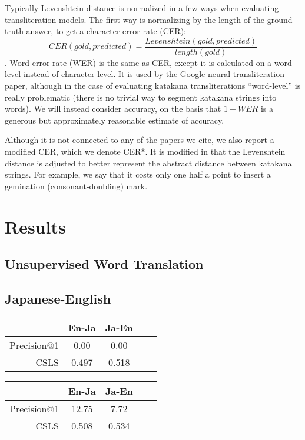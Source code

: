 \documentclass{article}
\begin{document}
Typically Levenshtein distance is normalized in a few ways
when evaluating transliteration models.
The first way is normalizing by the length of the ground-truth answer,
to get a character error rate (CER):
$$CER(gold, predicted) = \frac{Levenshtein(gold, predicted)}{length(gold)}$$.
Word error rate (WER) is the same as CER,
except it is calculated on a word-level instead of character-level.
It is used by the Google neural transliteration paper,
although in the case of evaluating katakana transliterations
``word-level'' is really problematic
(there is no trivial way to segment katakana strings into words).
We will instead consider accuracy,
on the basis that $1 - WER$
is a generous but approximately reasonable estimate of accuracy.

Although it is not connected to any of the papers we cite,
we also report a modified CER,
which we denote CER*.
It is modified in that the Levenshtein distance
is adjusted to better represent the abstract distance between katakana strings.
For example,
we say that it costs only one half a point
to insert a gemination (consonant-doubling) mark.

\section*{Results}

\subsection*{Unsupervised Word Translation}

\subsection*{Japanese-English}

\begin{table}[h]
  \centering
  \begin{tabular}{||r|cc|cc||}
    \hline
    & En-Ja & Ja-En \\
    \hline
    Precision@1 &  0.00 &  0.00 \\
    CSLS        & 0.497 & 0.518 \\
    \hline
  \end{tabular}
\end{table}

\begin{table}[h]
  \centering
  \begin{tabular}{||r|cc|cc||}
    \hline
    & En-Ja & Ja-En \\
    \hline
    Precision@1 & 12.75 &  7.72 \\
    CSLS        & 0.508 & 0.534 \\
    \hline
  \end{tabular}
\end{table}
\end{document}
